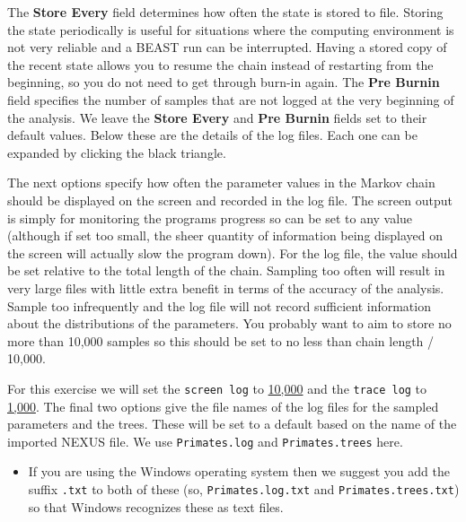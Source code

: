 \documentclass[11pt]{article}
\theoremstyle{plain}%
\theoremstyle{definition}
\theoremstyle{remark}
\newcommand{\includeimage}[2][]{%
\texttt{[image: \#2]}
}
\newcommand{\logEvery}{{1,000}}
\newcommand{\screenEvery}{{10,000}}
\begin{document}

The \textbf{Store Every} field determines how often the state is stored to file. Storing
the state periodically is useful for situations where the computing environment
is not very reliable and a BEAST run can be interrupted. Having a stored copy
of the recent state allows you to resume the chain instead of restarting from the
beginning, so you do not need to get through burn-in again.
The \textbf{Pre Burnin} field specifies the number of samples that are not logged at the very beginning of
the analysis. We leave the \textbf{Store Every} and \textbf{Pre Burnin} fields set to their default
values. Below these are the details of the log files. Each one can be expanded by
clicking the black triangle.

The next options specify how often the parameter values in the Markov
chain should be displayed on the screen and recorded in the log file.
The screen output is simply for monitoring the programs progress so
can be set to any value (although if set too small, the sheer quantity
of information being displayed on the screen will actually slow the
program down). For the log file, the value should be set relative
to the total length of the chain. Sampling too often will result in
very large files with little extra benefit in terms of the accuracy
of the analysis. Sample too infrequently and the log file will not
record sufficient information about the distributions of the parameters. 
You probably want to aim to store no more than 10,000 samples so this should be
set to no less than chain length / 10,000.

For this exercise we will set the \texttt{screen log} to \underline{\screenEvery{}} and the \texttt{trace log} to \underline{\logEvery{}}. The final two
options give the file names of the log files for the sampled parameters and
the trees. These will be set to a default based on the name of the
imported NEXUS file. We use \texttt{Primates.log} and \texttt{Primates.trees} here.

\begin{itemize}
\item If you are using the Windows operating system then we suggest you add the suffix \texttt{.txt} to both of these (so,
\texttt{Primates.log.txt} and \texttt{Primates.trees.txt}) so that Windows recognizes
these as text files. 
\end{itemize}
\end{document}
